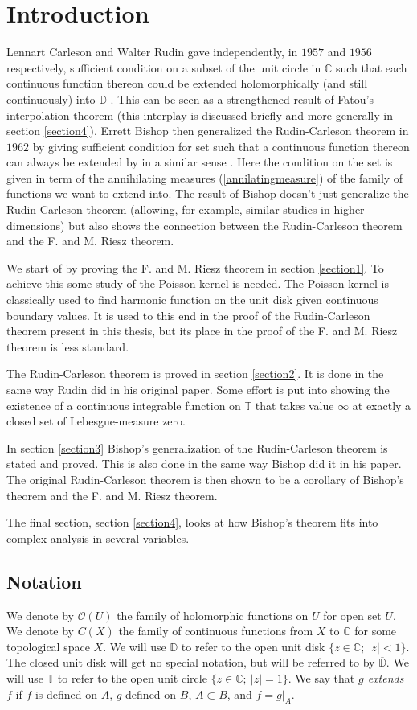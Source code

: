 \documentclass[a4paper,12pt,twoside,BCOR=10mm]{scrbook}
\theoremstyle{definition}
\theoremstyle{definition}
\theoremstyle{definition}
\begin{document}
\setcounter{page}{1}
\chapter{Introduction}
Lennart Carleson and Walter Rudin gave independently, in $1957$ and $1956$ respectively, sufficient condition on a subset of the unit circle in $\mathbb{C}$ such that each continuous function thereon could be extended holomorphically (and still continuously) into $\mathbb{D}$ \citep{rudin, carleson}.
This can be seen as a strengthened result of Fatou's interpolation theorem \citep{fatou} (this interplay is discussed briefly and more generally in section \ref{section4}).
Errett Bishop then generalized the Rudin-Carleson theorem in $1962$ by giving sufficient condition for set such that a continuous function thereon can always be extended by in a similar sense \citep{bishop}.
Here the condition on the set is given in term of the annihilating measures (\ref{annilatingmeasure}) of the family of functions we want to extend into.
The result of Bishop doesn't just generalize the Rudin-Carleson theorem (allowing, for example, similar studies in higher dimensions) but also shows the connection between the Rudin-Carleson theorem and the F. and M. Riesz theorem. %

We start of by proving the F. and M. Riesz theorem in section \ref{section1}.
To achieve this some study of the Poisson kernel is needed.
The Poisson kernel is classically used to find harmonic function on the unit disk given continuous boundary values.
It is used to this end in the proof of the Rudin-Carleson theorem present in this thesis, but its place in the proof of the F. and M. Riesz theorem is less standard.

The Rudin-Carleson theorem is proved in section \ref{section2}.
It is done in the same way Rudin did in his original paper.
Some effort is put into showing the existence of a continuous integrable function on $\mathbb{T}$ that takes value $\infty$ at exactly a closed set of Lebesgue-measure zero.

In section \ref{section3} Bishop's generalization of the Rudin-Carleson theorem is stated and proved.
This is also done in the same way Bishop did it in his paper.
The original Rudin-Carleson theorem is then shown to be a corollary of Bishop's theorem and the F. and M. Riesz theorem.

The final section, section \ref{section4}, looks at how Bishop's theorem fits into complex analysis in several variables.
\section{Notation}
We denote by $\mathcal{O}(U)$ the family of holomorphic functions on $U$ for open set $U$.
We denote by $C(X)$ the family of continuous functions from $X$ to $\mathbb{C}$ for some topological space $X$.
We will use $\mathbb{D}$ to refer to the open unit disk $\{z \in \mathbb{C};\ |z| < 1\}$.
The closed unit disk will get no special notation, but will be referred to by $\overline{\mathbb{D}}$.
We will use $\mathbb{T}$ to refer to the open unit circle $\{z \in \mathbb{C};\ |z| = 1\}$.
We say that \emph{$g$ extends $f$} if
	$f$ is defined on $A$,
	$g$ defined on $B$,
	$A \subset B$,
	and $f = g|_A$.
\end{document}
